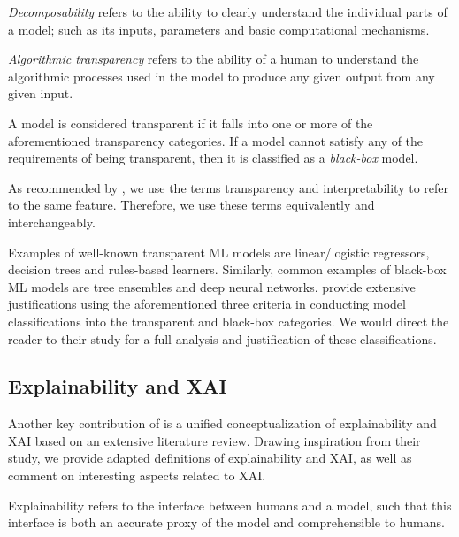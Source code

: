 \begin{remark}
  \textit{Decomposability} refers to the ability to clearly understand the
  individual parts of a model; such as its inputs, parameters and basic
  computational mechanisms.
\end{remark}

\begin{remark}
  \textit{Algorithmic transparency} refers to the ability of a human to
  understand the algorithmic processes used in the model to produce any given
  output from any given input.
\end{remark}

\begin{remark}
  A model is considered transparent if it falls into one or more of the
  aforementioned transparency categories. If a model cannot satisfy any of the
  requirements of being transparent, then it is classified as a
  \textit{black-box} model.
\end{remark}

\begin{remark}
  \label{rmk:equivalence}
  As recommended by \citet[Page 3, Section 2.1]{arrieta2020explainable}, we use
  the terms transparency and interpretability to refer to the same feature.
  Therefore, we use these terms equivalently and interchangeably.
\end{remark}

Examples of well-known transparent ML models are linear/logistic regressors,
decision trees and rules-based learners. Similarly, common examples of black-box
ML models are tree ensembles and deep neural networks.
\citet{arrieta2020explainable} provide extensive justifications using the
aforementioned three criteria in conducting model classifications into the
transparent and black-box categories. We would direct the reader to their study
for a full analysis and justification of these classifications.

\subsection{Explainability and XAI}

Another key contribution of \citet{arrieta2020explainable} is a unified
conceptualization of explainability and XAI based on an extensive literature
review. Drawing inspiration from their study, we provide adapted definitions of
explainability and XAI, as well as comment on interesting aspects related to
XAI.

\begin{definition}
  Explainability refers to the interface between humans and a model, such that
  this interface is both an accurate proxy of the model and comprehensible to
  humans.
\end{definition}

